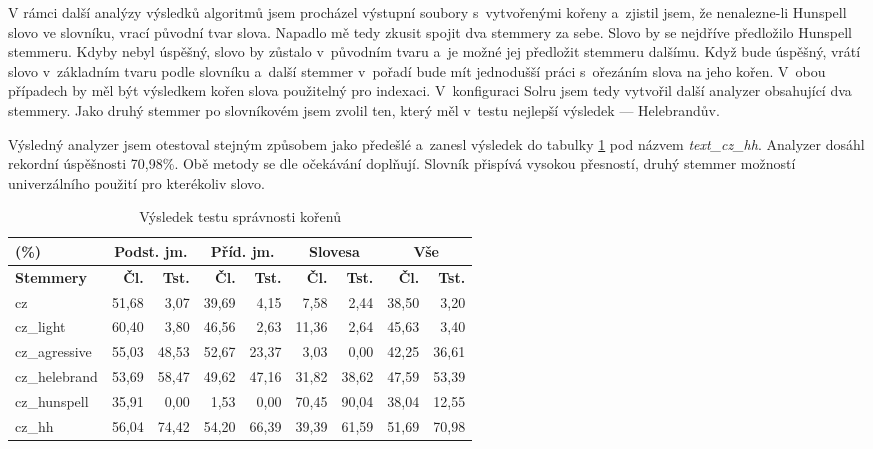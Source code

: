 V rámci další analýzy výsledků algoritmů jsem procházel výstupní soubory s~vytvořenými kořeny a~zjistil jsem, že nenalezne-li Hunspell slovo ve slovníku, vrací původní tvar slova. Napadlo mě tedy zkusit spojit dva stemmery za sebe. Slovo by se nejdříve předložilo Hunspell stemmeru. Kdyby nebyl úspěšný, slovo by zůstalo v~původním tvaru a~je možné jej předložit stemmeru dalšímu. Když bude úspěšný, vrátí slovo v~základním tvaru podle slovníku a~další stemmer v~pořadí bude mít jednodušší práci s~ořezáním slova na jeho kořen. V~obou případech by měl být výsledkem kořen slova použitelný pro indexaci. V~konfiguraci Solru jsem tedy vytvořil další analyzer obsahující dva stemmery. Jako druhý stemmer po slovníkovém jsem zvolil ten, který měl v~testu nejlepší výsledek --- Helebrandův.

Výsledný analyzer jsem otestoval stejným způsobem jako předešlé a~zanesl výsledek do tabulky \ref{tab:test_stm} pod názvem \emph{text\_cz\_hh}. Analyzer dosáhl rekordní úspěšnosti 70,98\%. Obě metody se dle očekávání doplňují. Slovník přispívá vysokou přesností, druhý stemmer možností univerzálního použití pro kterékoliv slovo.

\begin{table}
\begin{center}
\begin{tabular}{|l|r|r|r|r|r|r|r|r|}
\hline
(\%) & \multicolumn{2}{|c|}{\textbf{Podst. jm.}} & \multicolumn{2}{|c|}{\textbf{Příd. jm.}} & \multicolumn{2}{|c|}{\textbf{Slovesa}} & \multicolumn{2}{|c|}{\textbf{Vše}} \\ \hline
\textbf{Stemmery} & \textbf{Čl.} & \textbf{Tst.} & \textbf{Čl.} & \textbf{Tst.} & \textbf{Čl.} & \textbf{Tst.} & \textbf{Čl.} & \textbf{Tst.} \\ \hline
cz & 51,68 & 3,07 & 39,69 & 4,15 & 7,58 & 2,44 & 38,50 & 3,20 \\ \hline
cz\_light & 60,40 & 3,80 & 46,56 & 2,63 & 11,36 & 2,64 & 45,63 & 3,40 \\ \hline
cz\_agressive & 55,03 & 48,53 & 52,67 & 23,37 & 3,03 & 0,00 & 42,25 & 36,61 \\ \hline
cz\_helebrand & 53,69 & 58,47 & 49,62 & 47,16 & 31,82 & 38,62 & 47,59 & 53,39 \\ \hline
cz\_hunspell & 35,91 & 0,00 & 1,53 & 0,00 & 70,45 & 90,04 & 38,04 & 12,55 \\ \hline
\hline
cz\_hh & 56,04 & 74,42 & 54,20 & 66,39 & 39,39 & 61,59 & 51,69 & 70,98 \\ \hline
\end{tabular}
\end{center}
\caption{Výsledek testu správnosti kořenů}
\label{tab:test_stm}
\end{table}


